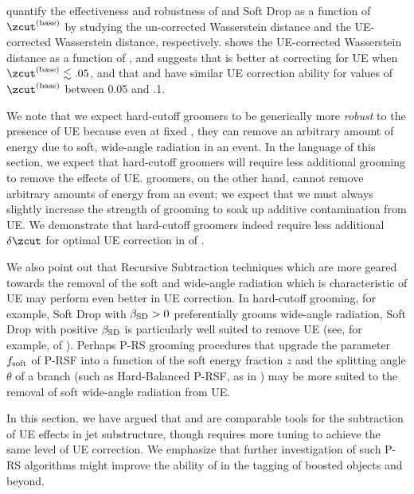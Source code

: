 \documentclass[letterpaper,11pt]{article}
\begin{document}
 quantify the effectiveness and robustness of  and Soft Drop as a function of \(\zcut^{(\rm base)}\) by studying the un-corrected Wasserstein distance and the UE-corrected Wasserstein distance, respectively.
%
 shows the UE-corrected Wasserstein distance as a function of \zcut, and suggests that  is better at correcting for UE when \(\zcut^{(\rm base)} \lesssim .05\), and that  and  have similar UE correction ability for values of \(\zcut^{(\rm base)}\) between 0.05 and .1.

We note that we expect hard-cutoff groomers to be generically more \textit{robust} to the presence of UE because even at fixed \zcut, they can remove an arbitrary amount of energy due to soft, wide-angle radiation in an event.
%
In the language of this section, we expect that hard-cutoff groomers will require less additional grooming to remove the effects of UE.
%
\PIRANHA{} groomers, on the other hand, cannot remove arbitrary amounts of energy from an event;
%
we expect that we must always slightly increase the strength of \PIRANHA{} grooming to soak up additive contamination from UE.
%
We demonstrate that hard-cutoff groomers indeed require less additional \(\delta\zcut\) for optimal UE correction in  of .

    We also point out that Recursive Subtraction techniques which are more geared towards the removal of the soft and wide-angle radiation which is characteristic of UE may perform even better in UE correction.
    In hard-cutoff grooming, for example, Soft Drop with \(\beta_{\rm SD} > 0\) preferentially grooms wide-angle radiation, Soft Drop with positive \(\beta_{\rm SD}\) is particularly well suited to remove UE (see, for example,  of ).
   Perhaps P-RS grooming procedures that upgrade the parameter \(f_{\rm soft}\) of P-RSF into a function of the soft energy fraction \(z\) and the splitting angle \(\theta\) of a branch  (such as Hard-Balanced P-RSF, as in ) may be more suited to the removal of soft wide-angle radiation from UE.

   In this section, we have argued that  and  are comparable tools for the subtraction of UE effects in jet substructure, though  requires more tuning to achieve the same level of UE correction.
   We emphasize that further investigation of such P-RS algorithms might improve the ability of \PIRANHA{} in the tagging of boosted objects and beyond.
\end{document}
